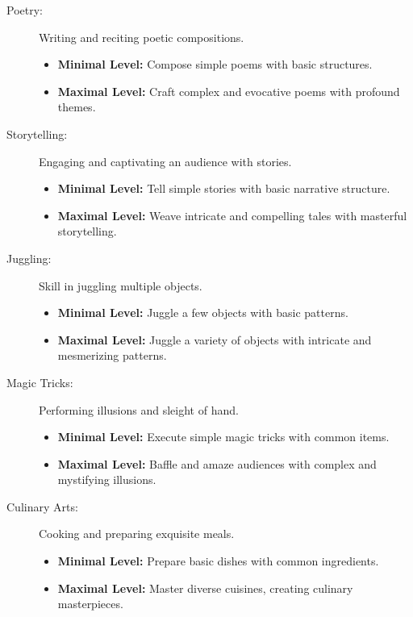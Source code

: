 \documentclass[12pt]{book}  %
\begin{document}
\begin{description}
    \item[Poetry:] Writing and reciting poetic compositions.
        \begin{itemize}
            \item \textbf{Minimal Level:} Compose simple poems with basic structures.
            \item \textbf{Maximal Level:} Craft complex and evocative poems with profound themes.
        \end{itemize}

    \item[Storytelling:] Engaging and captivating an audience with stories.
        \begin{itemize}
            \item \textbf{Minimal Level:} Tell simple stories with basic narrative structure.
            \item \textbf{Maximal Level:} Weave intricate and compelling tales with masterful storytelling.
        \end{itemize}

    \item[Juggling:] Skill in juggling multiple objects.
        \begin{itemize}
            \item \textbf{Minimal Level:} Juggle a few objects with basic patterns.
            \item \textbf{Maximal Level:} Juggle a variety of objects with intricate and mesmerizing patterns.
        \end{itemize}

    \item[Magic Tricks:] Performing illusions and sleight of hand.
        \begin{itemize}
            \item \textbf{Minimal Level:} Execute simple magic tricks with common items.
            \item \textbf{Maximal Level:} Baffle and amaze audiences with complex and mystifying illusions.
        \end{itemize}

    \item[Culinary Arts:] Cooking and preparing exquisite meals.
        \begin{itemize}
            \item \textbf{Minimal Level:} Prepare basic dishes with common ingredients.
            \item \textbf{Maximal Level:} Master diverse cuisines, creating culinary masterpieces.
        \end{itemize}

\end{description}
\end{document}
